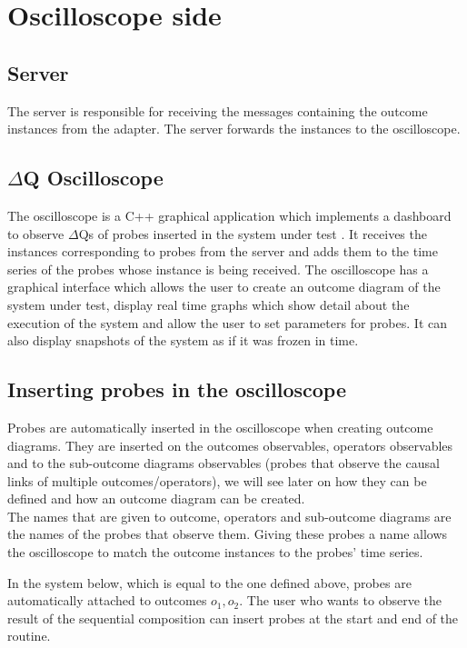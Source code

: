 \section{Oscilloscope side}
    \subsection{Server} The server is responsible for receiving the messages containing the outcome instances from the adapter. The server forwards the instances to the oscilloscope.
    
    \subsection{$\Delta$Q Oscilloscope} The oscilloscope is a C++ graphical application which implements a dashboard to observe $\Delta$Qs of probes inserted in the system under test \cite{osc-g}. It receives the instances corresponding to probes from the server and adds them to the time series of the probes whose instance is being received. 
    The oscilloscope has a graphical interface which allows the user to create an outcome diagram of the system under test, display real time graphs which show detail about the execution of the system and allow the user to set parameters for probes. It can also display snapshots of the system as if it was frozen in time.

    \subsection{Inserting probes in the oscilloscope}
        Probes are automatically inserted in the oscilloscope when creating outcome diagrams. They are inserted on the outcomes observables, operators observables and to the sub-outcome diagrams observables (probes that observe the causal links of multiple outcomes/operators), we will see later on how they can be defined and how an outcome diagram can be created. \\
    The names that are given to outcome, operators and sub-outcome diagrams are the names of the probes that observe them. Giving these probes a name allows the oscilloscope to match the outcome instances to the probes' time series.

        In the system below, which is equal to the one defined above, probes are automatically attached to outcomes $o_1, o_2$. The user who wants to observe the result of the sequential composition can insert probes at the start and end of the routine. 
    
